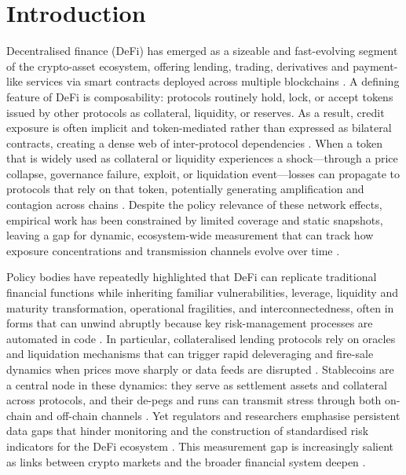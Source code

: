 \section{Introduction}


Decentralised finance (DeFi) has emerged as a sizeable and fast-evolving segment of the crypto-asset ecosystem, offering lending, trading, derivatives and payment-like services via smart contracts deployed across multiple blockchains \cite{Schar2021DeFi,Gogol2024SoKDeFi}. A defining feature of DeFi is composability: protocols routinely hold, lock, or accept tokens issued by other protocols as collateral, liquidity, or reserves. As a result, credit exposure is often implicit and token-mediated rather than expressed as bilateral contracts, creating a dense web of inter-protocol dependencies \cite{wu2025,Bertomeu2024}. When a token that is widely used as collateral or liquidity experiences a shock---through a price collapse, governance failure, exploit, or liquidation event---losses can propagate to protocols that rely on that token, potentially generating amplification and contagion across chains \cite{Aufiero2025,Gogol2024SoKDeFi}. Despite the policy relevance of these network effects, empirical work has been constrained by limited coverage and static snapshots, leaving a gap for dynamic, ecosystem-wide measurement that can track how exposure concentrations and transmission channels evolve over time \cite{Wu2025}.

Policy bodies have repeatedly highlighted that DeFi can replicate traditional financial functions while inheriting familiar vulnerabilities, leverage, liquidity and maturity transformation, operational fragilities, and interconnectedness, often in forms that can unwind abruptly because key risk-management processes are automated in code \cite{FSB2023,IOSCO2023DeFi}. In particular, collateralised lending protocols rely on oracles and liquidation mechanisms that can trigger rapid deleveraging and fire-sale dynamics when prices move sharply or data feeds are disrupted \cite{DuleyEtAl2023Oracle,SasiBrodeskyNassr2023DeFiLiquidations,TianZhu2025Liquidations}. Stablecoins are a central node in these dynamics: they serve as settlement assets and collateral across protocols, and their de-pegs and runs can transmit stress through both on-chain and off-chain channels \cite{KosseEtAl2023Stablecoin,AnaduEtAl2023StablecoinsMMF,ESRB2025}. Yet regulators and researchers emphasise persistent data gaps that hinder monitoring and the construction of standardised risk indicators for the DeFi ecosystem \cite{FSB2023,IOSCO2023DeFi}. This measurement gap is increasingly salient as links between crypto markets and the broader financial system deepen \cite{ESRB2025}.


